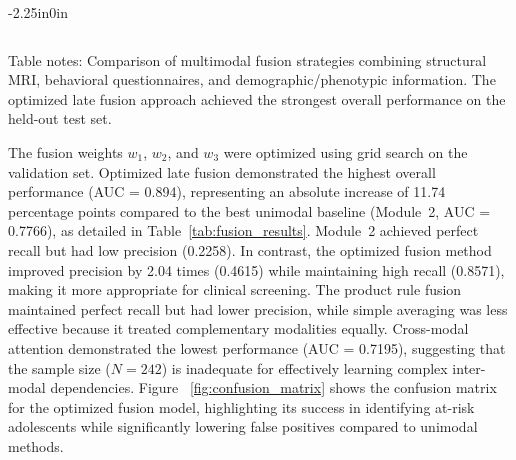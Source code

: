 \documentclass[10pt,letterpaper]{article}
\begin{document}
\begin{table}[!t]
\begin{adjustwidth}{-2.25in}{0in}
\begin{tabular}{|p{3.0cm}|p{3.0cm}|p{2.0cm}|p{2.0cm}|p{2.0cm}|p{2.0cm}|}
                                                                                                                          \end{tabular}

                                                                                                                          \begin{flushleft}
                                                                                                                          Table notes: Comparison of multimodal fusion strategies combining
                                                                                                                          structural MRI, behavioral questionnaires, and demographic/phenotypic
                                                                                                                          information. The optimized late fusion approach achieved the strongest
                                                                                                                          overall performance on the held-out test set.
                                                                                                                          \end{flushleft}

                                                                                                                          \end{adjustwidth}
                                                                                                                          \end{table}

                                                                                                                          The fusion weights $w_1$, $w_2$, and $w_3$ were optimized using grid search on the validation set. Optimized late fusion demonstrated the highest overall performance (AUC = 0.894), representing an absolute increase of 11.74 percentage points compared to the best unimodal baseline (Module~2, AUC = 0.7766), as detailed in Table~\ref{tab:fusion_results}. Module~2 achieved perfect recall but had low precision (0.2258). In contrast, the optimized fusion method improved precision by 2.04 times (0.4615) while maintaining high recall (0.8571), making it more appropriate for clinical screening. The product rule fusion maintained perfect recall but had lower precision, while simple averaging was less effective because it treated complementary modalities equally. Cross-modal attention demonstrated the lowest performance (AUC = 0.7195), suggesting that the sample size ($N = 242$) is inadequate for effectively learning complex inter-modal dependencies. Figure ~\ref{fig:confusion_matrix} shows the confusion matrix for the optimized fusion model, highlighting its success in identifying at-risk adolescents while significantly lowering false positives compared to unimodal methods.
\end{document}

